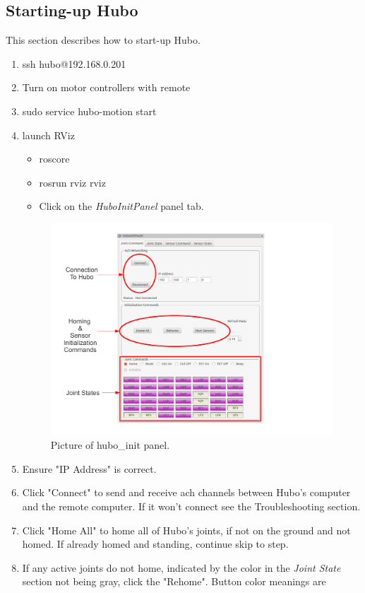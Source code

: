 \documentclass[letterpaper, 10 pt]{report}
\begin{document}
\subsection{Starting-up Hubo}
This section describes how to start-up Hubo.
\begin{enumerate}
  \item ssh hubo@192.168.0.201
  \item Turn on motor controllers with remote
  \item sudo service hubo-motion start
  \item launch RViz
    \begin{itemize}
    	  \item roscore
    	  \item rosrun rviz rviz
    	  \item Click on the \textit{HuboInitPanel} panel tab.
    \end{itemize}
  \begin{figure}[ht]
    \centering
    \includegraphics[width=15.0cm]{figures/hubo-init.pdf}
    \caption{Picture of hubo\_init panel.}
    \label{fig:hubo-init-image}
  \end{figure}
  \item Ensure "IP Address" is correct.
  \item Click "Connect" to send and receive ach channels between Hubo's computer and the remote computer. If it won't connect see the Troubleshooting section.
  \item Click "Home All" to home all of Hubo's joints, if not on the ground and not homed. If already homed and standing, continue skip to step.
  \item If any active joints do not home, indicated by the color in the \textit{Joint State} section not being gray, click the "Rehome". Button color meanings are

\end{enumerate}
\end{document}
